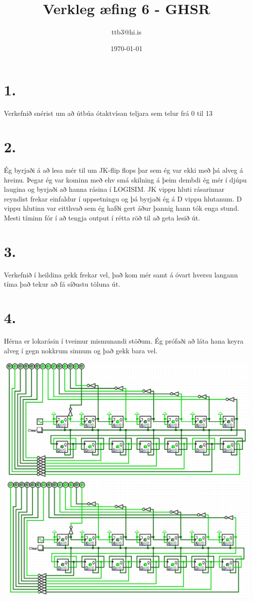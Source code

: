 \documentclass{article}
\title{Verkleg æfing 6 - GHSR}
\author{ttb3@hi.is}
\date{\today}
\begin{document}
\maketitle

\section*{1.}
Verkefnið snérist um að útbúa ótaktvísan teljara sem telur frá 0 til 13

\section*{2.}
Ég byrjaði á að lesa mér til um JK-flip flops þar sem ég var ekki með þá alveg á hreinu. 
Þegar ég var kominn með ehv smá skilning á þeim dembdi ég mér í djúpu laugina og byrjaði að hanna rásina í LOGISIM. 
JK vippu hluti rásarinnar reyndist frekar einfaldur í uppsetningu og þá byrjaði ég á D vippu hlutanum. 
D vippu hlutinn var eitthvað sem ég hafði gert áður þannig hann tók enga stund. 
Mesti tíminn fór í að tengja output í rétta röð til að geta lesið út.

\section*{3.}
Verkefnið í heildina gekk frekar vel, það kom mér samt á óvart hversu langann tíma það tekur að fá síðustu töluna út.

\section*{4.}
Hérna er lokarásin í tveimur mismunandi stöðum. Ég prófaði að láta hana keyra alveg í gegn nokkrum sinnum og það gekk bara vel.
\begin{center}
    \includegraphics[scale=0.25]{Screenshot from 2022-04-09 13-01-42.png}
    \includegraphics[scale=0.25]{Screenshot from 2022-04-09 13-03-20.png}
\end{center}
\end{document}
